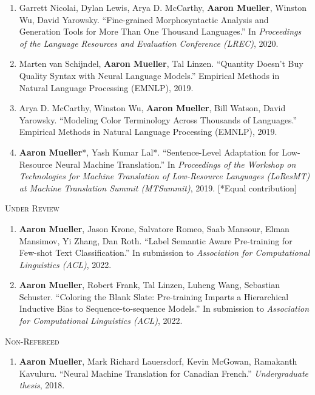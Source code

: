 \documentclass[10pt]{article}
\newcommand{\halfblankline}{\quad\vspace{-0.5\baselineskip}\pagebreak[3]}
\begin{document}
\begin{enumerate}[leftmargin=*, topsep=0pt, itemsep=-1ex, partopsep=0ex, parsep=1ex]
	\item Garrett Nicolai, Dylan Lewis, Arya D. McCarthy, \textbf{Aaron Mueller}, Winston Wu, David Yarowsky. ``Fine-grained Morphosyntactic Analysis and Generation Tools for More Than One Thousand Languages.'' In \emph{Proceedings of the Language Resources and Evaluation Conference (LREC)}, 2020.

	\item Marten van Schijndel, \textbf{Aaron Mueller}, Tal Linzen. ``Quantity Doesn't Buy Quality Syntax with Neural Language Models.'' Empirical Methods in Natural Language Processing (EMNLP), 2019.

	\item Arya D. McCarthy, Winston Wu, \textbf{Aaron Mueller}, Bill Watson, David Yarowsky. ``Modeling Color Terminology Across Thousands of Languages.'' Empirical Methods in Natural Language Processing (EMNLP), 2019.

	\item \textbf{Aaron Mueller}*, Yash Kumar Lal*. ``Sentence-Level Adaptation for Low-Resource Neural Machine Translation.'' In \emph{Proceedings of the Workshop on Technologies for Machine Translation of Low-Resource Languages (LoResMT) at Machine Translation Summit (MTSummit)}, 2019. [*Equal contribution]
	\end{enumerate}

	\halfblankline

	\textsc{Under Review}
	\begin{enumerate}[resume,leftmargin=*, topsep=0pt, itemsep=-1ex, partopsep=0ex, parsep=1ex]
	\item \textbf{Aaron Mueller}, Jason Krone, Salvatore Romeo, Saab Mansour, Elman Mansimov, Yi Zhang, Dan Roth. ``Label Semantic Aware Pre-training for Few-shot Text Classification.'' In submission to \emph{Association for Computational Linguistics (ACL)}, 2022.
	
	\item \textbf{Aaron Mueller}, Robert Frank, Tal Linzen, Luheng Wang, Sebastian Schuster. ``Coloring the Blank Slate: Pre-training Imparts a Hierarchical Inductive Bias to Sequence-to-sequence Models.'' In submission to \emph{Association for Computational Linguistics (ACL)}, 2022.
	\end{enumerate}

	\halfblankline

	\textsc{Non-Refereed}
	\begin{enumerate}[resume,leftmargin=*, topsep=0pt, itemsep=-1ex, partopsep=0ex, parsep=1ex]
	\item \textbf{Aaron Mueller}, Mark Richard Lauersdorf, Kevin McGowan, Ramakanth Kavuluru. ``Neural Machine Translation for Canadian French.'' \emph{Undergraduate thesis}, 2018.
	\end{enumerate}
\end{document}
